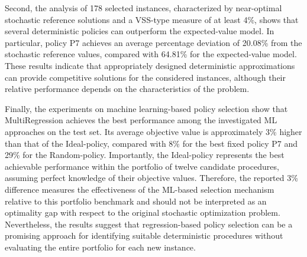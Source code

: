 \documentclass[authoryear,preprint,12pt]{elsarticle}
\begin{document}
{Second, the analysis of 178 selected instances, characterized by near-optimal stochastic reference solutions and a VSS-type measure of at least 4\%, shows that several deterministic policies can outperform the expected-value model. In particular, policy P7 achieves an average percentage deviation of 20.08\% from the stochastic reference values, compared with 64.81\% for the expected-value model. These results indicate that appropriately designed deterministic approximations can provide competitive solutions for the considered instances, although their relative performance depends on the characteristics of the problem.

Finally, the experiments on machine learning-based policy selection show that MultiRegression achieves the best performance among the investigated ML approaches on the test set. Its average objective value is approximately 3\% higher than that of the Ideal-policy, compared with 8\% for the best fixed policy P7 and 29\% for the Random-policy. Importantly, the Ideal-policy represents the best achievable performance within the portfolio of twelve candidate procedures, assuming perfect knowledge of their objective values. Therefore, the reported 3\% difference measures the effectiveness of the ML-based selection mechanism relative to this portfolio benchmark and should not be interpreted as an optimality gap with respect to the original stochastic optimization problem. Nevertheless, the results suggest that regression-based policy selection can be a promising approach for identifying suitable deterministic procedures without evaluating the entire portfolio for each new instance.}
\end{document}

